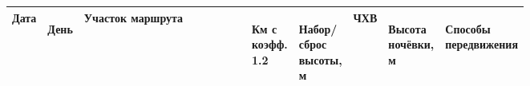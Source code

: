 \begin{table}[h!]
	\begin{tabular}{|>{\centering\arraybackslash}m{0.045\linewidth}
								|>{\centering\arraybackslash}m{0.02\linewidth}
								|>{\centering\arraybackslash}m{0.4\linewidth}
								|>{\centering\arraybackslash}m{0.04\linewidth}
								|>{\centering\arraybackslash}m{0.07\linewidth}
								|>{\centering\arraybackslash}m{0.05\linewidth}
								|>{\centering\arraybackslash}m{0.043\linewidth}
								|>{\centering\arraybackslash}m{0.085\linewidth}|}
		\hline						
		Дата	&	\begin{turn}{90}День\end{turn}	&	Участок маршрута	&	\begin{turn}{90}Км с коэфф. 1.2\end{turn}	&	\begin{turn}{90} 			Набор/сброс высоты, м		\end{turn}	&	ЧХВ	&	\begin{turn}{90}Высота ночёвки, м\end{turn}	&	\begin{turn}{90}Способы передвижения\end{turn}	\\
		\hline
		

\end{tabular}
\end{table}
